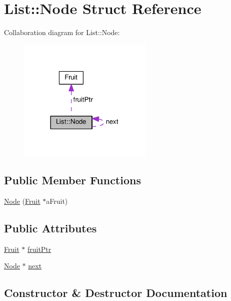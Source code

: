 \hypertarget{structList_1_1Node}{}\section{List\+:\+:Node Struct Reference}
\label{structList_1_1Node}


Collaboration diagram for List\+:\+:Node\+:
\nopagebreak
\begin{figure}[H]
\begin{center}
\leavevmode
\includegraphics[width=182pt]{structList_1_1Node__coll__graph}
\end{center}
\end{figure}
\subsection*{Public Member Functions}
\begin{DoxyCompactItemize}
\item 
\hyperlink{structList_1_1Node_a3832f8af7db4dc1984446e030144a8cf}{Node} (\hyperlink{classFruit}{Fruit} $\ast$a\+Fruit)
\end{DoxyCompactItemize}
\subsection*{Public Attributes}
\begin{DoxyCompactItemize}
\item 
\hyperlink{classFruit}{Fruit} $\ast$ \hyperlink{structList_1_1Node_a0014e96ae0a971590091f68233a8de2f}{fruit\+Ptr}
\item 
\hyperlink{structList_1_1Node}{Node} $\ast$ \hyperlink{structList_1_1Node_a0e9bd3ca8dc4c1307c04ecb2250fdada}{next}
\end{DoxyCompactItemize}


\subsection{Constructor \& Destructor Documentation}
